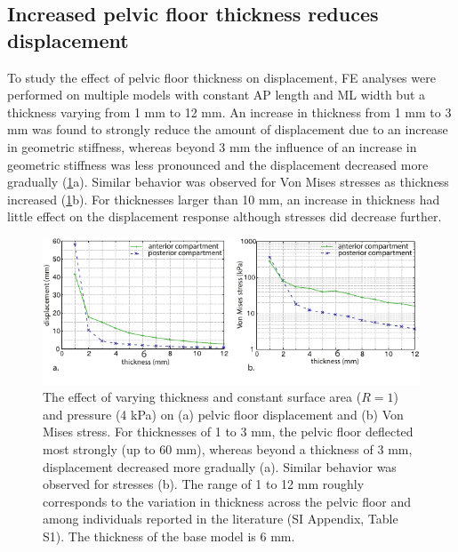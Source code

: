 \documentclass[9pt,twocolumn,twoside]{pnas-new}
\begin{document}
\subsection*{Increased pelvic floor thickness reduces displacement} 
To study the effect of pelvic floor thickness on displacement, FE analyses were performed on multiple models with constant AP length and ML width but a thickness varying from 1 mm to 12 mm. An increase in thickness from 1 mm to 3 mm was found to strongly reduce the amount of displacement due to an increase in geometric stiffness, whereas beyond 3 mm the influence of an increase in geometric stiffness was less pronounced and the displacement decreased more gradually (\cref{fig:thickness}a). Similar behavior was observed for Von Mises stresses as thickness increased (\cref{fig:thickness}b). For thicknesses larger than 10 mm, an increase in thickness had little effect on the displacement response although stresses did decrease further.

\begin{figure}
\centering
\includegraphics[width=.8\textwidth]{figs/fig3}
\caption{The effect of varying thickness and constant surface area ($R = 1$) and pressure (4 kPa) on (a) pelvic floor displacement and (b) Von Mises stress. For
thicknesses of 1 to 3 mm, the pelvic floor deflected most strongly (up to 60 mm), whereas beyond a thickness of 3 mm, displacement decreased more
gradually (a). Similar behavior was observed for stresses (b). The range of 1 to 12 mm roughly corresponds to the variation in thickness across the pelvic floor
and among individuals reported in the literature (SI Appendix, Table S1). The thickness of the base model is 6 mm.}
\label{fig:thickness}
\end{figure}
\end{document}
